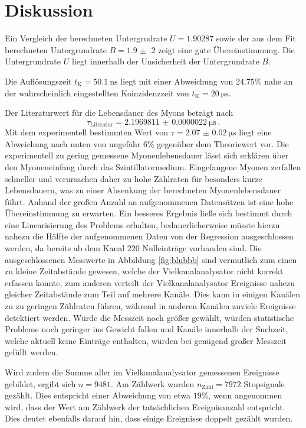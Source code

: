 \section{Diskussion}
\label{sec:Diskussion}
Ein Vergleich der berechneten Untergrudrate $U= \num{1.90287} $ sowie der aus dem Fit berechneten Untergrundrate $B=\num{1.9(2)}$ zeigt eine gute Übereinstimmung. Die Untergrundrate $U$ liegt innerhalb der Unsicherheit der Untergrundrate $B$.

Die Auflösungszeit $t_{\text{K}}=\SI{50.1}{\nano\second}$ liegt mit einer Abweichung von $24.75\%$ nahe an der wahrscheinlich eingestellten Koinzidenzzeit von $t_{\text{K}}=\SI{20}{\micro\second}$.


Der Literaturwert für die Lebensdauer des Myons beträgt nach \cite{myon}
\begin{equation*}
	\tau_\text{Literatur} = \SI{2.1969811(22)}{\micro\second}\, \mathrm{.}
\end{equation*}
Mit dem experimentell bestimmten Wert von $\tau=\SI{2.07(2)}{\micro\second}$ liegt eine Abweichung nach unten von ungefähr $6 \%$ gegenüber dem Theoriewert vor.
Die experimentell zu gering gemessene Myonenlebensdauer lässt sich erklären über den Myoneneinfang durch das Szintillatormedium. Eingefangene Myonen zerfallen schneller und verursachen daher zu hohe Zählraten für besonders kurze Lebensdauern, was zu einer Absenkung der berechneten Myonenlebensdauer führt.
Anhand der großen Anzahl an aufgenommenen Datensätzen ist eine hohe Übereinstimmung zu erwarten. Ein besseres Ergebnis ließe sich bestimmt durch eine Linearisierung des Problems erhalten, bedauerlicherweise müsste hierzu nahezu die Hälfte der aufgenommenen Daten von der Regression ausgeschlossen werden, da bereits ab dem Kanal $220$ Nulleinträge vorhanden sind.
Die ausgeschlossenen Messwerte in Abbildung \ref{fig:blubbb} sind vermutlich zum einen zu kleine Zeitabstände gewesen, welche der Vielkanalanalysator nicht korrekt erfassen konnte, zum anderen verteilt der Vielkanalanalysator Ereignisse nahezu gleicher Zeitabstände zum Teil auf mehrere Kanäle. Dies kann in einigen Kanälen zu zu geringen Zählraten führen, während in anderen Kanälen zuviele Ereignisse detektiert werden.
Würde die Messzeit noch größer gewählt, würden statistische Probleme noch geringer ins Gewicht fallen und Kanäle innerhalb der Suchzeit, welche aktuell keine Einträge enthalten, würden bei genügend großer Messzeit gefüllt werden.

Wird zudem die Summe aller im Vielkanalanalysator gemessenen Ereignisse gebildet, ergibt sich $n=\num{9481}$. Am Zählwerk wurden $n_{\text{Zähl}}=\num{7972}$ Stopsignale gezählt. Dies entspricht einer Abweichung von etwa $19\%$, wenn angenommen wird, dass der Wert am Zählwerk der tatsächlichen Ereignisanzahl entspricht. Dies deutet ebenfalls darauf hin, dass einige Ereignisse doppelt gezählt wurden.


